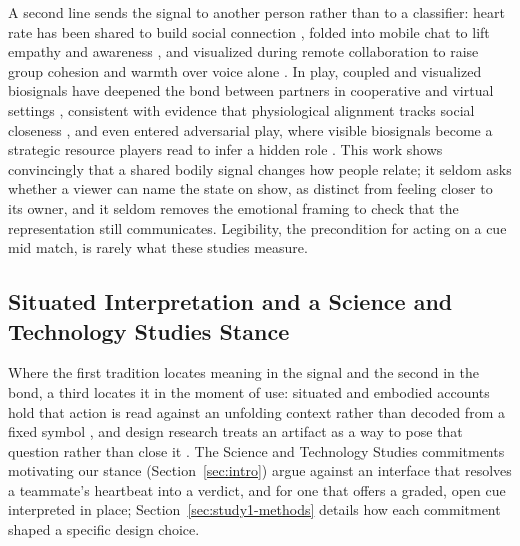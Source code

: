 \documentclass[manuscript,review,anonymous]{acmart}
\begin{document}
A second line sends the signal to another person rather than to a classifier: heart rate has been shared to build social connection \cite{slovak_understanding_2012, moge_shared_2022}, folded into mobile chat to lift empathy and awareness \cite{hassib_heartchat_2017}, and visualized during remote collaboration to raise group cohesion and warmth over voice alone \cite{tan_role_2014}. In play, coupled and visualized biosignals have deepened the bond between partners in cooperative and virtual settings \cite{jarvela_augmented_2021, hirsch_my_2023, jiang_intimasea_2023, muller_intra-_2013}, consistent with evidence that physiological alignment tracks social closeness \cite{dikker_brain--brain_2017}, and even entered adversarial play, where visible biosignals become a strategic resource players read to infer a hidden role \cite{fang_cardiac_2022}. This work shows convincingly that a shared bodily signal changes how people relate; it seldom asks whether a viewer can name the state on show, as distinct from feeling closer to its owner, and it seldom removes the emotional framing to check that the representation still communicates. Legibility, the precondition for acting on a cue mid match, is rarely what these studies measure.

\subsection{Situated Interpretation and a Science and Technology Studies Stance}
Where the first tradition locates meaning in the signal and the second in the bond, a third locates it in the moment of use: situated and embodied accounts hold that action is read against an unfolding context rather than decoded from a fixed symbol \cite{suchman_plans_1987, dourish_where_2004}, and design research treats an artifact as a way to pose that question rather than close it \cite{wakkary_things_2021}. The Science and Technology Studies commitments motivating our stance (Section~\ref{sec:intro}) argue against an interface that resolves a teammate's heartbeat into a verdict, and for one that offers a graded, open cue interpreted in place; Section~\ref{sec:study1-methods} details how each commitment shaped a specific design choice.
\end{document}
